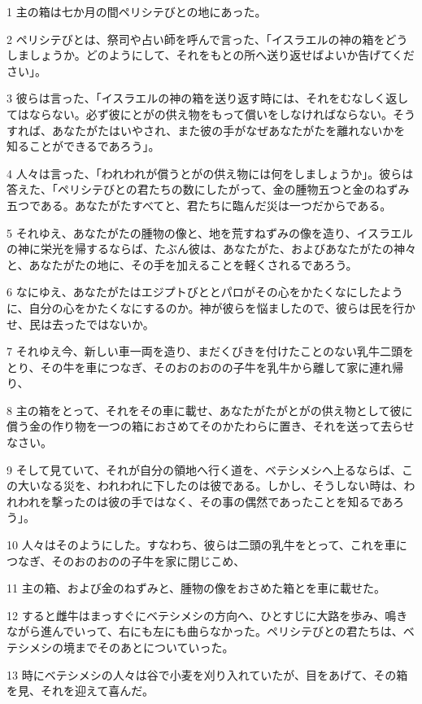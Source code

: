 \par 1 主の箱は七か月の間ペリシテびとの地にあった。
\par 2 ペリシテびとは、祭司や占い師を呼んで言った、「イスラエルの神の箱をどうしましょうか。どのようにして、それをもとの所へ送り返せばよいか告げてください」。
\par 3 彼らは言った、「イスラエルの神の箱を送り返す時には、それをむなしく返してはならない。必ず彼にとがの供え物をもって償いをしなければならない。そうすれば、あなたがたはいやされ、また彼の手がなぜあなたがたを離れないかを知ることができるであろう」。
\par 4 人々は言った、「われわれが償うとがの供え物には何をしましょうか」。彼らは答えた、「ペリシテびとの君たちの数にしたがって、金の腫物五つと金のねずみ五つである。あなたがたすべてと、君たちに臨んだ災は一つだからである。
\par 5 それゆえ、あなたがたの腫物の像と、地を荒すねずみの像を造り、イスラエルの神に栄光を帰するならば、たぶん彼は、あなたがた、およびあなたがたの神々と、あなたがたの地に、その手を加えることを軽くされるであろう。
\par 6 なにゆえ、あなたがたはエジプトびととパロがその心をかたくなにしたように、自分の心をかたくなにするのか。神が彼らを悩ましたので、彼らは民を行かせ、民は去ったではないか。
\par 7 それゆえ今、新しい車一両を造り、まだくびきを付けたことのない乳牛二頭をとり、その牛を車につなぎ、そのおのおのの子牛を乳牛から離して家に連れ帰り、
\par 8 主の箱をとって、それをその車に載せ、あなたがたがとがの供え物として彼に償う金の作り物を一つの箱におさめてそのかたわらに置き、それを送って去らせなさい。
\par 9 そして見ていて、それが自分の領地へ行く道を、ベテシメシへ上るならば、この大いなる災を、われわれに下したのは彼である。しかし、そうしない時は、われわれを撃ったのは彼の手ではなく、その事の偶然であったことを知るであろう」。
\par 10 人々はそのようにした。すなわち、彼らは二頭の乳牛をとって、これを車につなぎ、そのおのおのの子牛を家に閉じこめ、
\par 11 主の箱、および金のねずみと、腫物の像をおさめた箱とを車に載せた。
\par 12 すると雌牛はまっすぐにベテシメシの方向へ、ひとすじに大路を歩み、鳴きながら進んでいって、右にも左にも曲らなかった。ペリシテびとの君たちは、ベテシメシの境までそのあとについていった。
\par 13 時にベテシメシの人々は谷で小麦を刈り入れていたが、目をあげて、その箱を見、それを迎えて喜んだ。
